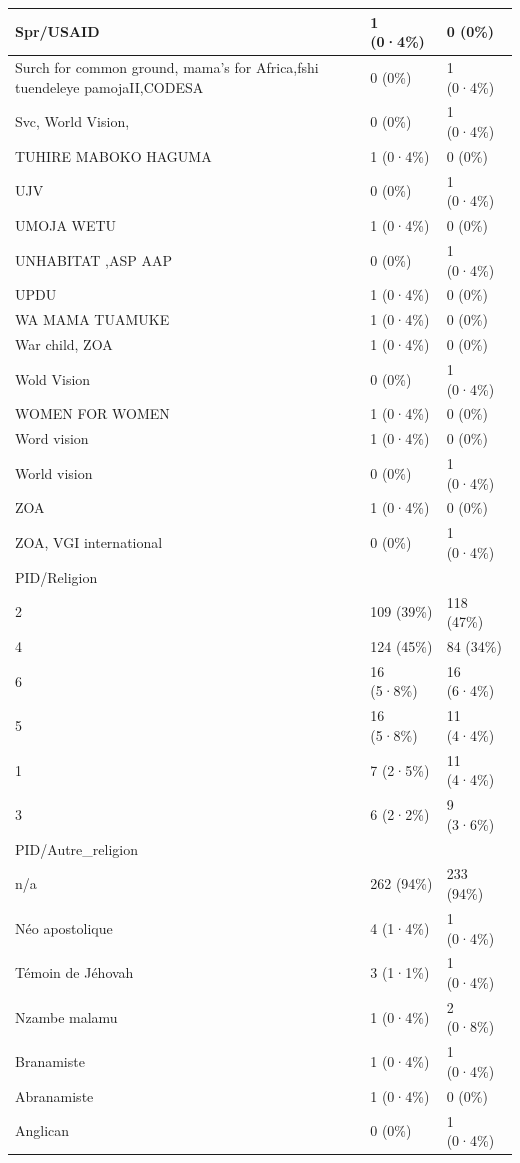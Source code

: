 \documentclass[
]{book}
\begin{document}
\begin{tabular}{l|l|l}
\hline
Spr/USAID & 1 (0·4\%) & 0 (0\%)\\
\hline
Surch for common ground, mama's for Africa,fshi tuendeleye pamojaII,CODESA & 0 (0\%) & 1 (0·4\%)\\
\hline
Svc, World Vision, & 0 (0\%) & 1 (0·4\%)\\
\hline
TUHIRE MABOKO HAGUMA & 1 (0·4\%) & 0 (0\%)\\
\hline
UJV & 0 (0\%) & 1 (0·4\%)\\
\hline
UMOJA WETU & 1 (0·4\%) & 0 (0\%)\\
\hline
UNHABITAT ,ASP AAP & 0 (0\%) & 1 (0·4\%)\\
\hline
UPDU & 1 (0·4\%) & 0 (0\%)\\
\hline
WA MAMA TUAMUKE & 1 (0·4\%) & 0 (0\%)\\
\hline
War child, ZOA & 1 (0·4\%) & 0 (0\%)\\
\hline
Wold Vision & 0 (0\%) & 1 (0·4\%)\\
\hline
WOMEN FOR WOMEN & 1 (0·4\%) & 0 (0\%)\\
\hline
Word vision & 1 (0·4\%) & 0 (0\%)\\
\hline
World vision & 0 (0\%) & 1 (0·4\%)\\
\hline
ZOA & 1 (0·4\%) & 0 (0\%)\\
\hline
ZOA, VGI international & 0 (0\%) & 1 (0·4\%)\\
\hline
PID/Religion &  & \\
\hline
2 & 109 (39\%) & 118 (47\%)\\
\hline
4 & 124 (45\%) & 84 (34\%)\\
\hline
6 & 16 (5·8\%) & 16 (6·4\%)\\
\hline
5 & 16 (5·8\%) & 11 (4·4\%)\\
\hline
1 & 7 (2·5\%) & 11 (4·4\%)\\
\hline
3 & 6 (2·2\%) & 9 (3·6\%)\\
\hline
PID/Autre\_religion &  & \\
\hline
n/a & 262 (94\%) & 233 (94\%)\\
\hline
Néo apostolique & 4 (1·4\%) & 1 (0·4\%)\\
\hline
Témoin de Jéhovah & 3 (1·1\%) & 1 (0·4\%)\\
\hline
Nzambe malamu & 1 (0·4\%) & 2 (0·8\%)\\
\hline
Branamiste & 1 (0·4\%) & 1 (0·4\%)\\
\hline
Abranamiste & 1 (0·4\%) & 0 (0\%)\\
\hline
Anglican & 0 (0\%) & 1 (0·4\%)\\

\end{tabular}
\end{document}
